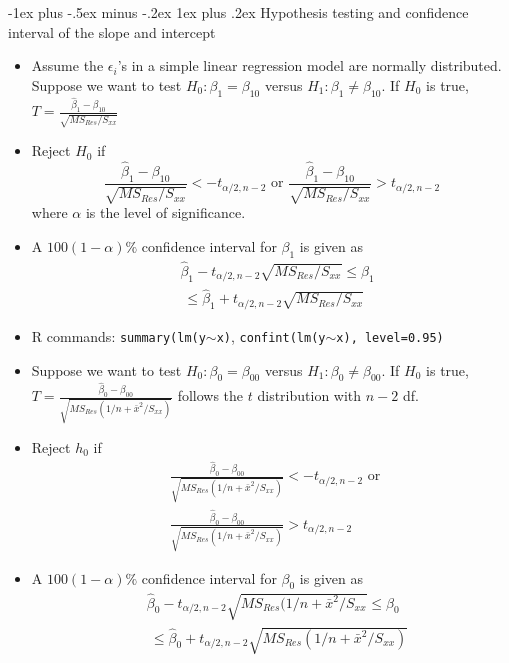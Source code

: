 \documentclass[frenchspacing,9pt,landscape,a4paper]{article}
\makeatletter
\renewcommand{\subsubsection}{\@startsection{subsubsection}{3}{0mm}%
                                {-1ex plus -.5ex minus -.2ex}%
                                {1ex plus .2ex}%
                                {\normalfont\small\bfseries}}
\makeatother
\begin{document}
\begin{multicols}{3}
\subsubsection{Hypothesis testing and confidence interval of the slope and intercept}
\begin{itemize}
	\item Assume the $\epsilon_i$'s in a simple linear regression model are normally distributed. Suppose we want to test  $H_0:\beta_1=\beta_{10}$ versus $H_1:\beta_1\neq\beta_{10}$. If $H_0$ is true, $T=\frac{\hat{\beta}_1-\beta_{10}}{\sqrt{MS_{Res} /S_{xx}}}$ 
	\item Reject $H_0$ if
		\[
		\frac{\hat{\beta}_1-\beta_{10}}{\sqrt{MS_{Res} / S_{xx}}}<-t_{\alpha /2,n-2}\text{ or } \frac{\hat{\beta}_1-\beta_{10}}{\sqrt{MS_{Res} / S_{xx}}}>t_{\alpha /2,n-2}
		\] where $\alpha$ is the level of significance.
	\item A $100(1-\alpha)\%$ confidence interval for  $\beta_1$ is given as
		\begin{align*}
			&\hat{\beta}_1-t_{\alpha /2,n-2}\sqrt{MS_{Res} /S_{xx}}\leq\beta_1\\
			&\ \leq\hat{\beta}_1+t_{\alpha /2,n-2}\sqrt{MS_{Res} /S_{xx}}		
		\end{align*}
	\item R commands: \texttt{summary(lm(y$\sim$x)}, \texttt{confint(lm(y$\sim$x), level=0.95)}
	\item Suppose we want to test $H_0:\beta_0=\beta_{00}$ versus $H_1:\beta_0\neq\beta_{00}$. If $H_0$ is true, $T=\frac{\hat{\beta}_0-\beta_{00}}{\sqrt{MS_{Res}(1 /n+\bar{x}^2 /S_{xx})}}$ follows the $t$ distribution with  $n-2$ df.
	\item Reject  $h_0$ if
		\begin{align*}
			&\frac{\hat{\beta}_0-\beta_{00}}{\sqrt{MS_{Res}(1 /n+\bar{x}^2 /S_{xx})}}<-t_{\alpha /2,n-2}\text{ or }\\ 
			&\frac{\hat{\beta}_0-\beta_{00}}{\sqrt{MS_{Res}(1 /n+\bar{x}^2 /S_{xx})}}>t_{\alpha /2,n-2}	
		\end{align*}
	\item A $100(1-\alpha)\%$ confidence interval for  $\beta_0$ is given as 
		\begin{align*}
			&\hat{\beta}_0-t_{\alpha /2,n-2}\sqrt{MS_{Res}(1 /n+\bar{x}^2 /S_{xx}}\leq\beta_0\\
			&\ \leq\hat{\beta}_0+t_{\alpha /2,n-2}\sqrt{MS_{Res}(1 /n+\bar{x}^2 /S_{xx})}
		\end{align*}
\end{itemize}

\end{multicols}
\end{document}
